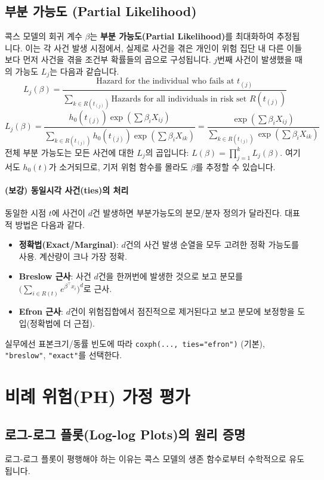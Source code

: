 \documentclass{article}
\begin{document}
\subsection{부분 가능도 (Partial Likelihood)}
콕스 모델의 회귀 계수 $\beta$는 \textbf{부분 가능도(Partial Likelihood)}를 최대화하여 추정됩니다. 이는 각 사건 발생 시점에서, 실제로 사건을 겪은 개인이 위험 집단 내 다른 이들보다 먼저 사건을 겪을 조건부 확률들의 곱으로 구성됩니다.
$j$번째 사건이 발생했을 때의 가능도 $L_j$는 다음과 같습니다.
$$L_j(\beta) = \frac{\text{Hazard for the individual who fails at } t_{(j)}}{\sum_{k \in R(t_{(j)})} \text{Hazards for all individuals in risk set } R(t_{(j)})}$$
$$L_j(\beta) = \frac{h_0(t_{(j)}) \exp(\sum \beta_i X_{ij})}{ \sum_{k \in R(t_{(j)})} h_0(t_{(j)}) \exp(\sum \beta_i X_{ik})} = \frac{\exp(\sum \beta_i X_{ij})}{\sum_{k \in R(t_{(j)})} \exp(\sum \beta_i X_{ik})}$$
전체 부분 가능도는 모든 사건에 대한 $L_j$의 곱입니다: $L(\beta) = \prod_{j=1}^k L_j(\beta)$. 여기서도 $h_0(t)$가 소거되므로, 기저 위험 함수를 몰라도 $\beta$를 추정할 수 있습니다.

\paragraph{(보강) 동일시각 사건(ties)의 처리}
동일한 시점 $t$에 사건이 $d$건 발생하면 부분가능도의 분모/분자 정의가 달라진다.
대표적 방법은 다음과 같다.
\begin{itemize}
  \item \textbf{정확법(Exact/Marginal)}: $d$건의 사건 발생 순열을 모두 고려한 정확 가능도를 사용. 계산량이 크나 가장 정확.
  \item \textbf{Breslow 근사}: 사건 $d$건을 한꺼번에 발생한 것으로 보고 분모를 $\big(\sum_{i\in R(t)} e^{\beta^\top x_i}\big)^d$로 근사.
  \item \textbf{Efron 근사}: $d$건이 위험집합에서 점진적으로 제거된다고 보고 분모에 보정항을 도입(정확법에 더 근접).
\end{itemize}
실무에선 표본크기/동률 빈도에 따라 \texttt{coxph(..., ties="efron")} (기본), \texttt{"breslow"}, \texttt{"exact"}를 선택한다.

\section{비례 위험(PH) 가정 평가}

\subsection{로그-로그 플롯(Log-log Plots)의 원리 증명}
로그-로그 플롯이 평행해야 하는 이유는 콕스 모델의 생존 함수로부터 수학적으로 유도됩니다.
\end{document}
